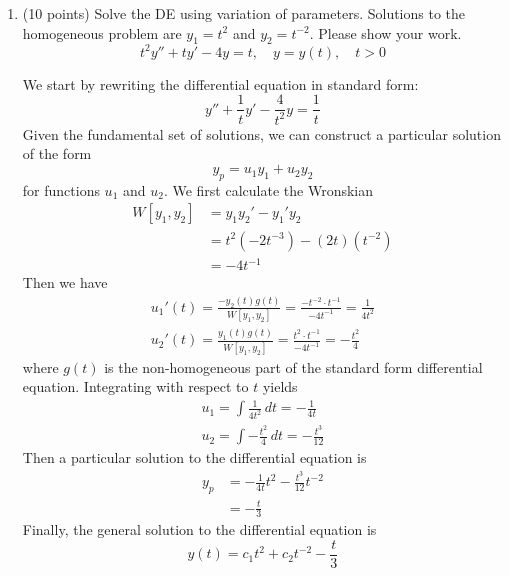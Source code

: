 \documentclass[11pt, titlepage]{article}
\begin{document}
\begin{enumerate}
        \item (10 points) Solve the DE using variation of parameters. Solutions
            to the homogeneous problem are $y_1 = t^2$ and $y_2 = t^{-2}$.
            Please show your work.
            \[
                t^2 y'' + ty' - 4y = t, \quad y = y(t), \quad t > 0
            \] 
            \begin{solution}
                We start by rewriting the differential equation in standard
                form:
                \[
                y'' + \frac{1}{t}y' - \frac{4}{t^2}y = \frac{1}{t}
                \] 
                Given the fundamental set of solutions, we can construct a
                particular solution of the form
                \[
                y_p = u_1 y_1 + u_2 y_2
                \] 
                for functions $u_1$ and $u_2$.
                We first calculate the Wronskian
                \begin{align*}
                    W[y_1, y_2] &= y_1 y_2' - y_1' y_2 \\
                              &= t^2 (-2t^{-3}) - (2t)(t^{-2}) \\
                                &= -4t^{-1}
                \end{align*}
                Then we have
                \begin{gather*}
                    u_1'(t) = \frac{-y_2(t) g(t)}{W[y_1, y_2]} = \frac{-t^{-2}
                    \cdot t^{-1}}{-4t^{-1}} = \frac{1}{4t^2} \\
                    u_2'(t) = \frac{y_1(t) g(t)}{W[y_1, y_2]} = \frac{t^2 \cdot
                    t^{-1}}{-4t^{-1}} = -\frac{t^2}{4}
                \end{gather*}
                where $g(t)$ is the non-homogeneous part of the standard form
                differential equation. Integrating with respect to $t$ yields
                \begin{gather*}
                    u_1 = \int \frac{1}{4t^2} \, dt = -\frac{1}{4t} \\
                    u_2 = \int -\frac{t^2}{4} \, dt = -\frac{t^3}{12}
                \end{gather*}
                Then a particular solution to the differential equation is
                \begin{align*}
                    y_p &= -\frac{1}{4t} t^2 - \frac{t^3}{12} t^{-2} \\
                        &= -\frac{t}{3}
                \end{align*}
                Finally, the general solution to the differential equation is
                \[
                    y(t) = c_1 t^2 + c_2 t^{-2} - \frac{t}{3}
                \] 
            \end{solution}
    \end{enumerate}
\end{document}

